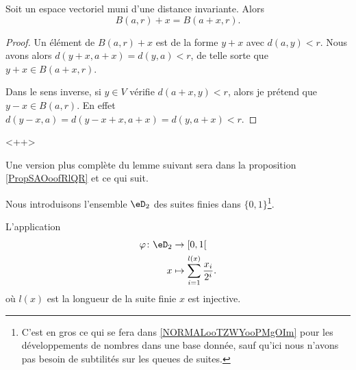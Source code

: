 \begin{lemma}        \label{LEMooZNBAooOhEwJd}
    Soit un espace vectoriel muni d'une distance invariante. Alors
    \begin{equation}
        B(a,r)+x=B(a+x,r).
    \end{equation}
\end{lemma}

\begin{proof}
    Un élément de \( B(a,r)+x\) est de la forme \( y+x\) avec \( d(a,y)<r\). Nous avons alors \( d(y+x,a+x)=d(y,a)<r\), de telle sorte que \( y+x\in B(a+x,r)\).

    Dans le sens inverse, si \( y\in V\) vérifie \( d(a+x,y)<r\), alors je prétend que \( y-x\in B(a,r)\). En effet \( d(y-x,a)=d(y-x+x,a+x)=d(y,a+x)<r\).
\end{proof}
<++>

Une version plus complète du lemme suivant sera dans la proposition \ref{PropSAOoofRlQR} et ce qui suit.
\begin{lemma}      \label{LEMooIQBXooUEtdoy}
    Nous introduisons l'ensemble \( \eD_2\) des suites finies dans \( \{ 0,1 \}\)\footnote{C'est en gros ce qui se fera dans \ref{NORMALooTZWYooPMgOIm} pour les développements de nombres dans une base donnée, sauf qu'ici nous n'avons pas besoin de subtilités sur les queues de suites.}.

    L'application
    \begin{equation}
        \begin{aligned}
            \varphi\colon \eD_2&\to \mathopen[ 0 , 1 \mathclose[ \\
                x&\mapsto \sum_{i=1}^{l(x)}\frac{ x_i }{ 2^i }. 
        \end{aligned}
    \end{equation}
    où \( l(x)\) est la longueur de la suite finie \( x\) est injective.
\end{lemma}

